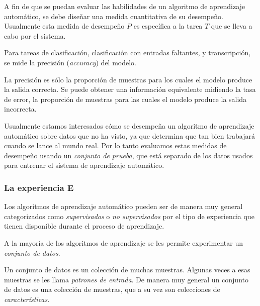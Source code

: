 A fin de que se puedan evaluar las habilidades de un algoritmo de
aprendizaje automático, se debe diseñar una medida cuantitativa de su
desempeño. Usualmente esta medida de desempeño $P$ es específica a la
tarea $T$ que se lleva a cabo por el sistema.

Para tareas de clasificación, clasificación con entradas faltantes, y
transcripción, se mide la precisión (\textit{accuracy}) del modelo. \\

\begin{remark}
La precisión
es sólo la proporción de muestras para los cuales el modelo produce la
salida correcta. Se puede obtener una información equivalente midiendo
la tasa de error, la proporción de muestras para las cuales el modelo
produce la salida incorrecta.
\end{remark}


Usualmente estamos interesados cómo se desempeña un algoritmo de
aprendizaje automático sobre datos que no ha visto,
ya que determina que tan bien trabajará cuando se lance al mundo real.
Por lo tanto evaluamos estas medidas de desempeño usando un \textit{conjunto de
prueba}, que está separado de los datos usados para entrenar el sistema
de aprendizaje automático.

\subsubsection{La experiencia E}

Los algoritmos de aprendizaje automático pueden ser de manera muy
general categorizados como \textit{supervisados} o \textit{no supervisados} por el tipo de
experiencia que tienen disponible durante el proceso de aprendizaje.

A la mayoría de los algoritmos de aprendizaje se les permite
experimentar un \textit{conjunto de datos}.\\

\begin{remark}
Un conjunto de datos es un
colección de muchas muestras. Algunas veces a esas muestras se les llama
\textit{patrones de entrada}.
De manera muy general un conjunto de datos
es una colección de muestras, que a su vez son colecciones de \textit{características}.
\end{remark}


